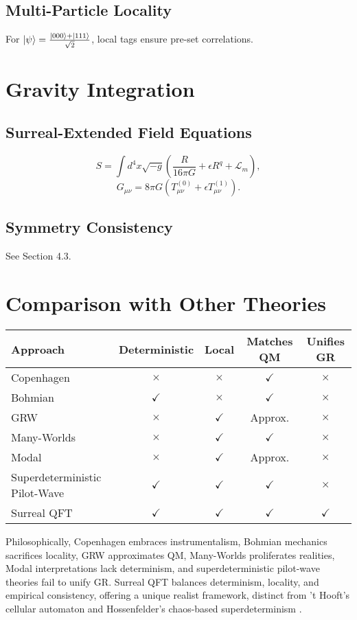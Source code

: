 \documentclass{article}
\begin{document}
\subsection{Multi-Particle Locality}
For \(\ket{\psi} = \frac{\ket{000} + \ket{111}}{\sqrt{2}}\), local tags ensure pre-set correlations.

\section{Gravity Integration}
\subsection{Surreal-Extended Field Equations}
\begin{equation}
S = \int d^4x \sqrt{-g} \left( \frac{R}{16\pi G} + \epsilon R^q + \mathcal{L}_m \right),
\end{equation}
\begin{equation}
G_{\mu\nu} = 8\pi G \left( T_{\mu\nu}^{(0)} + \epsilon T_{\mu\nu}^{(1)} \right).
\end{equation}

\subsection{Symmetry Consistency}
See Section 4.3.

\section{Comparison with Other Theories}
\begin{center}
\begin{tabular}{lcccc}
\hline
\textbf{Approach} & \textbf{Deterministic} & \textbf{Local} & \textbf{Matches QM} & \textbf{Unifies GR} \\
\hline
Copenhagen & $\times$ & $\times$ & $\checkmark$ & $\times$ \\
Bohmian & $\checkmark$ & $\times$ & $\checkmark$ & $\times$ \\
GRW & $\times$ & $\checkmark$ & Approx. & $\times$ \\
Many-Worlds & $\times$ & $\checkmark$ & $\checkmark$ & $\times$ \\
Modal & $\times$ & $\checkmark$ & Approx. & $\times$ \\
Superdeterministic Pilot-Wave & $\checkmark$ & $\checkmark$ & $\checkmark$ & $\times$ \\
Surreal QFT & $\checkmark$ & $\checkmark$ & $\checkmark$ & $\checkmark$ \\
\hline
\end{tabular}
\end{center}
Philosophically, Copenhagen embraces instrumentalism, Bohmian mechanics sacrifices locality, GRW approximates QM, Many-Worlds proliferates realities, Modal interpretations lack determinism, and superdeterministic pilot-wave theories fail to unify GR. Surreal QFT balances determinism, locality, and empirical consistency, offering a unique realist framework, distinct from 't Hooft's cellular automaton \cite{tHooft2014} and Hossenfelder's chaos-based superdeterminism \cite{Hossenfelder2020}.
\end{document}
